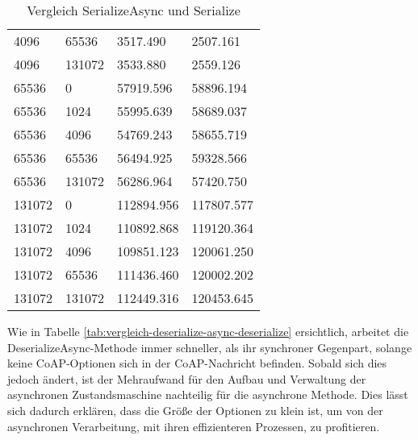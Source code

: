 \begin{table}[h]
\begin{tabular}{@{}llll@{}}
    4096                & 65536                 & 3517.490                                        & 2507.161                                   \\
    4096                & 131072                & 3533.880                                        & 2559.126                                   \\
    65536               & 0                     & 57919.596                                       & 58896.194                                  \\
    65536               & 1024                  & 55995.639                                       & 58689.037                                  \\
    65536               & 4096                  & 54769.243                                       & 58655.719                                  \\
    65536               & 65536                 & 56494.925                                       & 59328.566                                  \\
    65536               & 131072                & 56286.964                                       & 57420.750                                  \\
    131072              & 0                     & 112894.956                                      & 117807.577                                 \\
    131072              & 1024                  & 110892.868                                      & 119120.364                                 \\
    131072              & 4096                  & 109851.123                                      & 120061.250                                 \\
    131072              & 65536                 & 111436.460                                      & 120002.202                                 \\
    131072              & 131072                & 112449.316                                      & 120453.645                                 \\ \bottomrule
    \end{tabular}%
    \caption{Vergleich SerializeAsync und Serialize}
    \label{tab:vergleich-serialize-async-serialize}
\end{table}

Wie in Tabelle \ref{tab:vergleich-deserialize-async-deserialize} ersichtlich, arbeitet die DeserializeAsync-Methode immer schneller, als ihr synchroner Gegenpart, solange keine CoAP-Optionen sich in der CoAP-Nachricht befinden. Sobald sich dies jedoch ändert, ist der Mehraufwand für den Aufbau und Verwaltung der asynchronen Zustandsmaschine nachteilig für die asynchrone Methode. Dies lässt sich dadurch erklären, dass die Größe der Optionen zu klein ist, um von der asynchronen Verarbeitung, mit ihren effizienteren Prozessen, zu profitieren.

